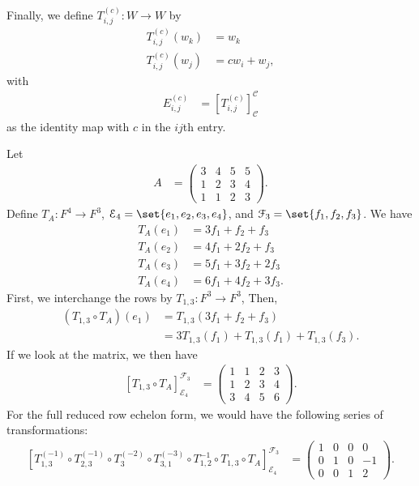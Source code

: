 \documentclass[10pt]{mypackage}
\begin{document}
Finally, we define $T_{i,j}^{(c)}:W\rightarrow W$ by
\begin{align*}
  T_{i,j}^{(c)}\left(w_k\right) &= w_k\tag*{$k\neq j$}\\
  T_{i,j}^{(c)}\left(w_j\right) &= cw_i + w_j,
\end{align*}
with
\begin{align*}
  E_{i,j}^{(c)} &= \left[T_{i,j}^{(c)}\right]_{\mathcal{C}}^{\mathcal{C}}
\end{align*}
as the identity map with $c$ in the $ij$th entry.
\begin{example}
  Let 
  \begin{align*}
    A &= \begin{pmatrix}3 & 4 & 5 & 5\\ 1 & 2 & 3 & 4 \\ 1 & 1 & 2 & 3\end{pmatrix}.
  \end{align*}
  Define $T_A: F^4\rightarrow F^3$, $\mathcal{E}_4 = \set{e_1,e_2,e_3,e_4}$, and $\mathcal{F}_3 = \set{f_1,f_2,f_3}$. We have
  \begin{align*}
    T_A\left(e_1\right) &= 3f_1 + f_2 + f_3\\
    T_A\left(e_2\right) &= 4f_1 + 2f_2 + f_3\\
    T_A\left(e_3\right) &= 5f_1 + 3f_2 + 2f_3\\
    T_A\left(e_4\right) &= 6f_1 + 4f_2 + 3f_3.
  \end{align*}
  First, we interchange the rows by $T_{1,3}:F^3\rightarrow F^3$, Then,
  \begin{align*}
    \left(T_{1,3}\circ T_A\right)\left(e_1\right) &= T_{1,3}\left(3f_1 + f_2 + f_3\right)\\
                                                  &= 3T_{1,3}\left(f_1\right) + T_{1,3}\left(f_1\right) + T_{1,3}\left(f_3\right).
  \end{align*}
  If we look at the matrix, we then have
  \begin{align*}
    \left[T_{1,3}\circ T_A\right]_{\mathcal{E}_4}^{\mathcal{F}_3} &= \begin{pmatrix}1 & 1 & 2 & 3 \\ 1 & 2 & 3 & 4 \\ 3 & 4 & 5 & 6\end{pmatrix}.
  \end{align*}
  For the full reduced row echelon form, we would have the following series of transformations:
  \begin{align*}
    \left[T_{1,3}^{(-1)}\circ T_{2,3}^{(-1)}\circ T_{3}^{(-2)}\circ T_{3,1}^{(-3)}\circ T_{1,2}^{-1}\circ T_{1,3}\circ T_A\right]_{\mathcal{E}_4}^{\mathcal{F}_3} &= \begin{pmatrix}1 & 0 & 0 & 0 \\ 0 & 1 & 0  & -1\\ 0 & 0 & 1 & 2\end{pmatrix}.
  \end{align*}
\end{example}
\end{document}

